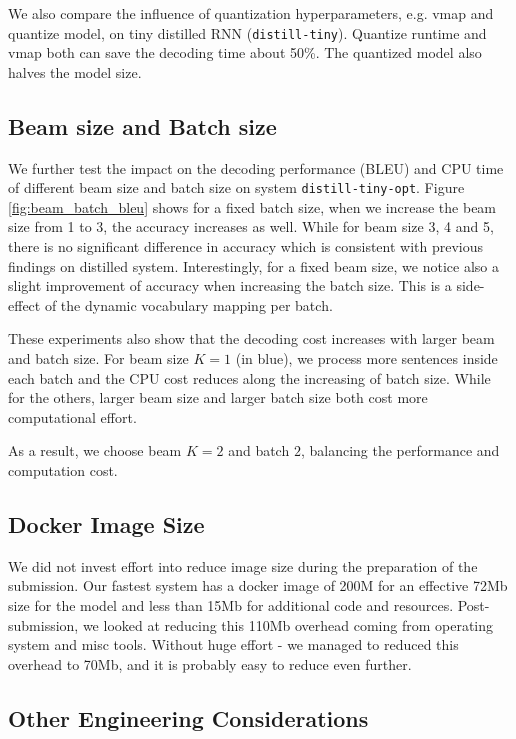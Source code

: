 \documentclass[11pt,a4paper]{article}
\begin{document}
We also compare the influence of quantization hyperparameters, e.g. vmap and quantize model, on tiny distilled RNN ({\tt distill-tiny}).
Quantize runtime and vmap both can save the decoding time about 50\%.
The quantized model also halves the model size.

\subsection{Beam size and Batch size}

We further test the impact on the decoding performance (BLEU) and CPU
time of different beam size and batch size on system {\tt distill-tiny-opt}.
Figure \ref{fig:beam_batch_bleu} shows for a fixed batch size, when we
increase the beam size from 1 to 3, the accuracy increases as well.
While for beam size 3, 4 and 5, there is no significant difference in
accuracy which is consistent with previous findings on distilled
system.  Interestingly, for a fixed beam size, we notice also a slight
improvement of accuracy when increasing the batch size. This is a
side-effect of the dynamic vocabulary mapping per batch.

%
These experiments also show that the decoding cost increases with
larger beam and batch size.  For beam size $K=1$ (in blue), we process
more sentences inside each batch and the CPU cost reduces along the
increasing of batch size.  While for the others, larger beam size and
larger batch size both cost more computational effort.

As a result,
we choose beam $K=2$ and batch $2$, balancing the performance and
computation cost.

%

\subsection{Docker Image Size}

We did not invest effort into reduce image size during the preparation
of the submission. Our fastest system has a docker image of 200M for
an effective 72Mb size for the model and less than 15Mb for additional
code and resources. Post-submission, we looked at reducing this 110Mb
overhead coming from operating system and misc tools. Without huge effort - we managed to reduced
this overhead to 70Mb, and it is probably easy to reduce even further.

\subsection{Other Engineering Considerations}
\label{other}
\end{document}
